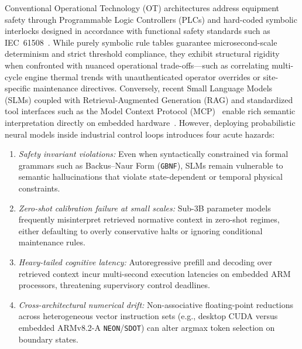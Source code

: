 \documentclass{ieeeaccess}
\begin{document}
Conventional Operational Technology (OT) architectures address equipment safety through Programmable Logic Controllers (PLCs) and hard-coded symbolic interlocks designed in accordance with functional safety standards such as IEC~61508~\cite{iec61508}. While purely symbolic rule tables guarantee microsecond-scale determinism and strict threshold compliance, they exhibit structural rigidity when confronted with nuanced operational trade-offs---such as correlating multi-cycle engine thermal trends with unauthenticated operator overrides or site-specific maintenance directives. Conversely, recent Small Language Models (SLMs) coupled with Retrieval-Augmented Generation (RAG) and standardized tool interfaces such as the Model Context Protocol (MCP)~\cite{mcp2024} enable rich semantic interpretation directly on embedded hardware~\cite{qwen25}. However, deploying probabilistic neural models inside industrial control loops introduces four acute hazards:
\begin{enumerate}
    \item \emph{Safety invariant violations:} Even when syntactically constrained via formal grammars such as Backus--Naur Form (\texttt{GBNF}), SLMs remain vulnerable to semantic hallucinations that violate state-dependent or temporal physical constraints.
    \item \emph{Zero-shot calibration failure at small scales:} Sub-3B parameter models frequently misinterpret retrieved normative context in zero-shot regimes, either defaulting to overly conservative halts or ignoring conditional maintenance rules.
    \item \emph{Heavy-tailed cognitive latency:} Autoregressive prefill and decoding over retrieved context incur multi-second execution latencies on embedded ARM processors, threatening supervisory control deadlines.
    \item \emph{Cross-architectural numerical drift:} Non-associative floating-point reductions across heterogeneous vector instruction sets (e.g., desktop CUDA versus embedded ARMv8.2-A \texttt{NEON}/\texttt{SDOT}) can alter argmax token selection on boundary states.
\end{enumerate}
\end{document}
